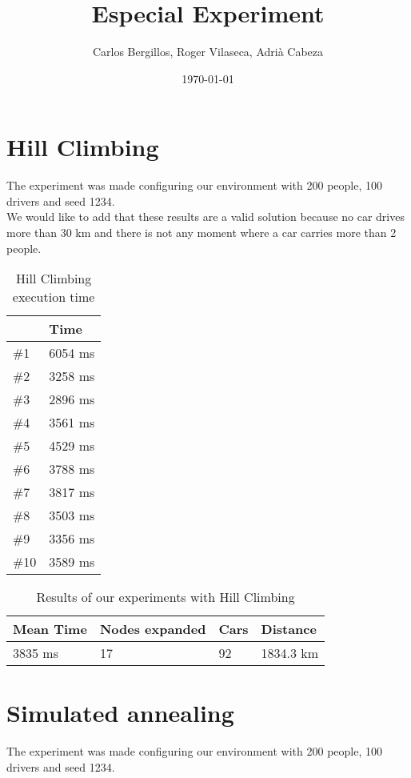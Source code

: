 \documentclass[12]{article}
\author{Carlos Bergillos, Roger Vilaseca, Adrià Cabeza}
\title{Especial Experiment}
\date{\today \medskip}
\begin{document}
\maketitle
\section{Hill Climbing}

The experiment was made configuring our environment with 200 people, 100 drivers and seed 1234.
\\

We would like to add that these results are a valid solution because no car drives more than 30 km and there is not any moment where a car carries more than 2 people. 
\\

\begin{table}[h]
\centering
\begin{tabular}{|l|l|}
\hline  & \textbf{Time} \\  \hline
\#1 & 6054 ms \\ \hline
\#2 & 3258 ms \\ \hline
\#3 & 2896 ms \\ \hline
\#4 & 3561 ms \\ \hline
\#5 & 4529 ms \\ \hline
\#6 & 3788 ms \\ \hline
\#7 & 3817 ms \\ \hline
\#8 & 3503 ms \\ \hline
\#9 & 3356 ms \\ \hline
\#10 & 3589 ms \\ \hline
\end{tabular}
\caption{Hill Climbing execution time}
\label{Results}
\end{table}

\begin{table}[h]
\centering
\begin{tabular}{|l|l|l|l|}
\hline \textbf{Mean Time} &
 \textbf{Nodes expanded} & \textbf{Cars} & \textbf{Distance}\\  \hline
3835 ms &  17 & 92 & 1834.3 km \\ \hline
\end{tabular}
\caption{Results of our experiments with Hill Climbing}
\label{Results}
\end{table}

\section{Simulated annealing}
The experiment was made configuring our environment with 200 people, 100 drivers and seed 1234.
\\
\end{document}
